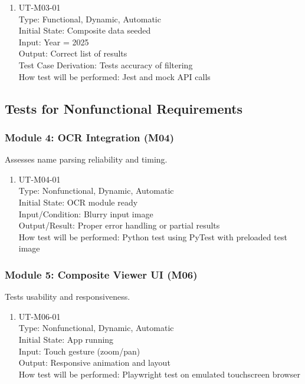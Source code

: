 \documentclass[12pt, titlepage]{article}
\begin{document}
\begin{enumerate}
  \item{UT-M03-01\\}
  Type: Functional, Dynamic, Automatic\\
  Initial State: Composite data seeded\\
  Input: Year = 2025\\
  Output: Correct list of results\\
  Test Case Derivation: Tests accuracy of filtering\\
  How test will be performed: Jest and mock API calls
\end{enumerate}

\subsection{Tests for Nonfunctional Requirements}

\subsubsection{Module 4: OCR Integration (M04)}
Assesses name parsing reliability and timing.

\begin{enumerate}
  \item{UT-M04-01\\}
  Type: Nonfunctional, Dynamic, Automatic\\
  Initial State: OCR module ready\\
  Input/Condition: Blurry input image\\
  Output/Result: Proper error handling or partial results\\
  How test will be performed: Python test using PyTest with preloaded test image
\end{enumerate}

\subsubsection{Module 5: Composite Viewer UI (M06)}
Tests usability and responsiveness.

\begin{enumerate}
  \item{UT-M06-01\\}
  Type: Nonfunctional, Dynamic, Automatic\\
  Initial State: App running\\
  Input: Touch gesture (zoom/pan)\\
  Output: Responsive animation and layout\\
  How test will be performed: Playwright test on emulated touchscreen browser
\end{enumerate}
\end{document}

